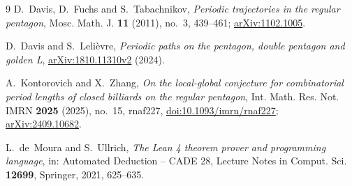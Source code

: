 \documentclass[11pt]{article}
\theoremstyle{definition}
\theoremstyle{remark}
\begin{document}
\begin{thebibliography}{9}
D.~Davis, D.~Fuchs and S.~Tabachnikov,
\emph{Periodic trajectories in the regular pentagon},
Mosc. Math. J. \textbf{11} (2011), no.~3, 439--461;
\href{https://arxiv.org/abs/1102.1005}{arXiv:1102.1005}.

D.~Davis and S.~Lelièvre,
\emph{Periodic paths on the pentagon, double pentagon and golden L},
\href{https://arxiv.org/abs/1810.11310v2}{arXiv:1810.11310v2} (2024).

A.~Kontorovich and X.~Zhang,
\emph{On the local-global conjecture for combinatorial period lengths of
closed billiards on the regular pentagon},
Int. Math. Res. Not. IMRN \textbf{2025} (2025), no.~15, rnaf227,
\href{https://doi.org/10.1093/imrn/rnaf227}{doi:10.1093/imrn/rnaf227};
\href{https://arxiv.org/abs/2409.10682}{arXiv:2409.10682}.

L.~de~Moura and S.~Ullrich,
\emph{The Lean 4 theorem prover and programming language},
in: Automated Deduction -- CADE 28, Lecture Notes in Comput. Sci.
\textbf{12699}, Springer, 2021, 625--635.
\end{thebibliography}
\end{document}
